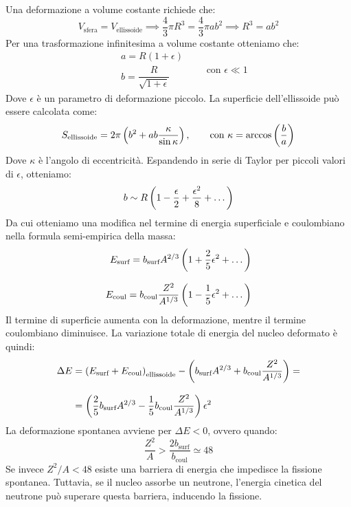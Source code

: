 Una deformazione a volume costante richiede che:
\begin{equation}
    V_{\text{sfera}} = V_{\text{ellissoide}} \implies \frac{4}{3} \pi R^3 = \frac{4}{3} \pi a b^2 \implies R^3 = a b^2
\end{equation}
Per una trasformazione infinitesima a volume costante otteniamo che:
\begin{equation}
    \begin{split}
        &a = R(1 + \epsilon) \\[8pt]
        &b = \dfrac{R}{\sqrt{1 + \epsilon}}
    \end{split} \qquad \text{con } \epsilon \ll 1
\end{equation}
Dove $\epsilon$ è un parametro di deformazione piccolo. La superficie dell'ellissoide può essere calcolata come:
\begin{equation}
    S_{\text{ellissoide}} = 2 \pi \left( b^2 + ab\dfrac{\kappa}{\sin \kappa}\right), \qquad \text{con } \kappa = \arccos\left(\dfrac{b}{a}\right)
\end{equation}
Dove $\kappa$ è l'angolo di eccentricità. Espandendo in serie di Taylor per piccoli valori di $\epsilon$, otteniamo:
\begin{equation}
    b \sim R\left(1 - \dfrac{\epsilon}{2} + \dfrac{\epsilon^2}{8} + \dots\right)
\end{equation}
Da cui otteniamo una modifica nel termine di energia superficiale e coulombiano nella formula semi-empirica della massa:
\begin{equation}
    \begin{split}
        E_{\text{surf}} = b_{\text{surf}} A^{2/3} \left(1 + \dfrac{2}{5} \epsilon^2  + \dots\right) \\[8pt]
        E_{\text{coul}} = b_{\text{coul}} \dfrac{Z^2}{A^{1/3}} \left(1 - \dfrac{1}{5} \epsilon^2  + \dots\right)
    \end{split}
\end{equation}
Il termine di superficie aumenta con la deformazione, mentre il termine coulombiano diminuisce. La variazione totale di energia del nucleo deformato è quindi:
\begin{equation}
    \begin{split}
        \Delta E &= \left(E_{\text{surf}} + E_{\text{coul}}\right)_{\text{ellissoide}} - \left(b_{\text{surf}} A^{2/3} + b_{\text{coul}} \dfrac{Z^2}{A^{1/3}}\right) = \\[8pt]
        &= \left(\dfrac{2}{5} b_{\text{surf}} A^{2/3} - \dfrac{1}{5} b_{\text{coul}} \dfrac{Z^2}{A^{1/3}}\right) \epsilon^2
    \end{split}
\end{equation}
La deformazione spontanea avviene per $\Delta E < 0$, ovvero quando:
\begin{equation}
    \dfrac{Z^2}{A} > \dfrac{2 b_{\text{surf}}}{b_{\text{coul}}} \simeq 48
\end{equation}
Se invece $Z^2/A < 48$ esiste una barriera di energia che impedisce la fissione spontanea. Tuttavia, se il nucleo assorbe un neutrone, l'energia cinetica del neutrone può superare questa barriera, inducendo la fissione.\\

